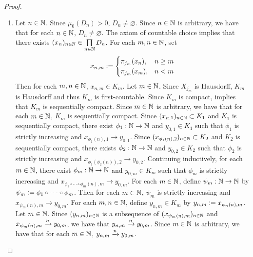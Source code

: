 \documentclass{book}
\begin{document}
\begin{proof}
\begin{enumerate}
\begin{enumerate}
\begin{align*}
					& < \infty, 
				\end{align*}
				  implies
				\begin{align*}
					\mu_0(B_n \setminus D_n)
					& = \mu_0(B_n) - \mu_0(D_n) \\
					& \geq \del - \mu_0(D_n). 
				\end{align*}
				Thus 
				\begin{align*}
					\mu_0(D_n)
					& \geq \del - \mu_0(B_n \setminus D_n) \\
					& > \del - \del \\
					& = 0.
				\end{align*}
				\item Let $n \in \mathbb{N}$. Since $\mu_0(D_n) > 0$, $D_n \neq \varnothing$. Since $n \in \mathbb{N}$ is arbitrary, we have that for each $n \in \mathbb{N}$, $D_n \neq \varnothing$. The axiom of countable choice implies that there exists $(x_n)_{n \in \mathbb{N}} \in \prod\limits_{n \in \mathbb{N}} D_n$. For each $m,n \in \mathbb{N}$, set  
				\[
				x_{n,m} 
				\vcentcolon=
				\begin{cases}
					\pi_{j_m}(x_n), & n \geq m \\
					\pi_{j_m}(x_m), &  n < m
				\end{cases}
				\]
				Then for each $m,n \in \mathbb{N}$, $x_{n,m} \in K_m$. Let $m \in \mathbb{N}$. Since $X_{j_m}$ is Hausdorff, $K_m$ is Hausdorff and thus $K_m$ is first-countable. Since $K_m$ is compact,  implies that $K_m$ is sequentially compact. Since $m \in \mathbb{N}$ is arbitrary, we have that for each $m \in \mathbb{N}$, $K_m$ is sequentially compact. Since $(x_{n, 1})_{n \in \mathbb{N}} \subset K_1$ and $K_1$ is sequentially compact, there exist $\phi_1:\mathbb{N} \rightarrow \mathbb{N}$ and $y_{0,1} \in K_1$ such that $\phi_1$ is strictly increasing and $x_{\phi_1(n), 1} \rightarrow y_{0,1}$. Since $(x_{\phi_1(n), 2})_{n \in \mathbb{N}} \subset K_2$ and $K_2$ is sequentially compact, there exists $\phi_2:\mathbb{N} \rightarrow \mathbb{N}$ and $y_{0,2} \in K_2$ such that $\phi_2$ is strictly increasing and $x_{\phi_1( \phi_2(n)), 2} \rightarrow y_{0,2}$. Continuing inductively, for each $m \in \mathbb{N}$, there exist $\phi_m: \mathbb{N} \rightarrow \mathbb{N}$ and $y_{0,m} \in K_m$ such that $\phi_m$ is strictly increasing and $x_{\phi_1 \circ \cdots \circ \phi_m(n), m} \rightarrow y_{0, m}$. For each $m \in \mathbb{N}$, define $\psi_m: \mathbb{N} \rightarrow \mathbb{N}$ by $\psi_m \vcentcolon= \phi_1 \circ \cdots \circ \phi_m$. Then for each $m \in \mathbb{N}$, $\psi_m$ is strictly increasing and $x_{\psi_m(n), m} \rightarrow y_{0,m}$. For each $m,n \in \mathbb{N}$, define $y_{n,m} \in K_m$ by $y_{n,m} \vcentcolon= x_{\psi_n(n), m}$. Let $m \in \mathbb{N}$. Since $(y_{n,m})_{n \in \mathbb{N}}$ is a subsequence of $(x_{\psi_m(n), m})_{n \in \mathbb{N}}$ and $x_{\psi_m(n), m} \xrightarrow{n} y_{0,m}$, we have that $y_{n, m} \xrightarrow{n} y_{0, m}$. Since $m \in \mathbb{N}$ is arbitrary, we have that for each $m \in \mathbb{N}$, $y_{n,m} \xrightarrow{n} y_{0, m}$.

\end{enumerate}
\end{enumerate}
\end{proof}
\end{document}
